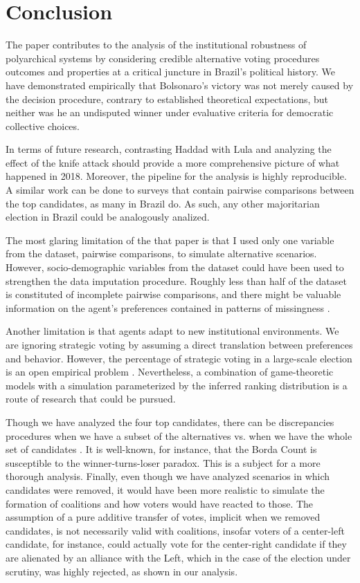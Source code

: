 \documentclass[hidelinks,11pt]{article}
\begin{document}
\section{Conclusion}

The paper contributes to the analysis of the institutional robustness of
polyarchical systems by considering credible alternative voting procedures
outcomes and properties at a critical juncture in Brazil's political history. We
have demonstrated empirically that Bolsonaro's victory was not merely caused by
the decision procedure, contrary to established theoretical expectations, but
neither was he an undisputed winner under evaluative criteria for democratic
collective choices.

In terms of future research, contrasting Haddad with Lula and analyzing the
effect of the knife attack should provide a more comprehensive picture of what
happened in 2018. Moreover, the pipeline for the analysis is highly
reproducible. A similar work can be done to surveys that contain pairwise
comparisons between the top candidates, as many in Brazil do. As such, any other
majoritarian election in Brazil could be analogously analized.

The most glaring limitation of the that paper is that I used only one variable
from the dataset, pairwise comparisons, to simulate alternative scenarios.
However, socio-demographic variables from the dataset could have been used to
strengthen the data imputation procedure. Roughly less than half of the dataset
is constituted of incomplete pairwise comparisons, and there might be valuable
information on the agent's preferences contained in patterns of missingness
\parencite{mcelreath2020statistical}.

Another limitation is that agents adapt to new institutional environments. We
are ignoring strategic voting by assuming a direct translation between
preferences and behavior. However, the percentage of strategic voting in a
large-scale election is an open empirical problem
\parencite{straeten10_strat_sincer_heuris_votin_under,kawai2013inferring}.
Nevertheless, a combination of game-theoretic models with a simulation
parameterized by the inferred ranking distribution is a route of research that
could be pursued.

Though we have analyzed the four top candidates, there can be discrepancies
procedures when we have a subset of the alternatives vs. when we have the whole
set of candidates \parencite{saari2001chaotic}. It is well-known, for instance,
that the Borda Count is susceptible to the winner-turns-loser paradox. This is a
subject for a more thorough analysis. Finally, even though we have analyzed
scenarios in which candidates were removed, it would have been more realistic to
simulate the formation of coalitions and how voters would have reacted to those.
The assumption of a pure additive transfer of votes, implicit when we removed
candidates, is not necessarily valid with coalitions, insofar voters of a
center-left candidate, for instance, could actually vote for the center-right
candidate if they are alienated by an alliance with the Left, which in the case
of the election under scrutiny, was highly rejected, as shown in our analysis.
\printbibliography
\end{document}
